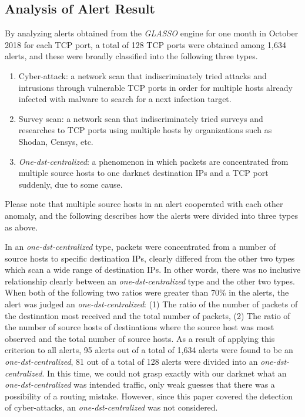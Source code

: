 \documentclass[conference]{IEEEtran}
\begin{document}
\subsection{Analysis of Alert Result}
By analyzing alerts obtained from the {\it GLASSO} engine for one month in October 2018 for each TCP port, a total of 128 TCP ports were obtained among 1,634 alerts, and these were broadly classified into the following three types.
\begin{enumerate}
  \item Cyber-attack: a network scan that indiscriminately tried attacks and intrusions through vulnerable TCP ports in order for multiple hosts already infected with malware to search for a next infection target.
  \item Survey scan: a network scan that indiscriminately tried surveys and researches to TCP ports using multiple hosts by organizations such as Shodan, Censys, etc.
  \item {\it One-dst-centralized}: a phenomenon in which packets are concentrated from multiple source hosts to one darknet destination IPs and a TCP port suddenly, due to some cause.
\end{enumerate}
Please note that multiple source hosts in an alert cooperated with each other anomaly, and the following describes how the alerts were divided into three types as above.


In an {\it one-dst-centralized} type, packets were concentrated from a number of source hosts to specific destination IPs, clearly differed from the other two types which scan a wide range of destination IPs.
In other words, there was no inclusive relationship clearly between an {\it one-dst-centralized} type and the other two types.
When both of the following two ratios were greater than 70\% in the alerts, the alert was judged an {\it one-dst-centralized}: (1) The ratio of the number of packets of the destination most received and the total number of packets, (2) The ratio of the number of source hosts of destinations where the source host was most observed and the total number of source hosts.
As a result of applying this criterion to all alerts, 95 alerts out of a total of 1,634 alerts were found to be an {\it one-dst-centralized}, 81 out of a total of 128 alerts were divided into an {\it one-dst-centralized}.
In this time, we could not grasp exactly with our darknet what an {\it one-dst-centralized} was intended traffic, only weak guesses that there was a possibility of a routing mistake.
However, since this paper covered the detection of cyber-attacks, an {\it one-dst-centralized} was not considered.
\end{document}
